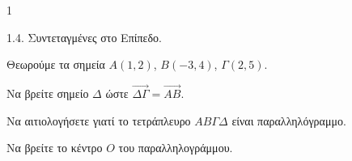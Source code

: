 \begin{ylh}{1}
    \item 1.4. Συντεταγμένες στο Επίπεδο.
\end{ylh}
Θεωρούμε τα σημεία $A(1, 2)$, $B(-3, 4)$, $\Gamma(2, 5)$.
\begin{alist}
\item Να βρείτε σημείο $\Delta$ ώστε $\vec{\Delta\Gamma} = \vec{AB}$. 
\item Να αιτιολογήσετε γιατί το τετράπλευρο $AB\Gamma\Delta$ είναι παραλληλόγραμμο. 
\item Να βρείτε το κέντρο $O$ του παραλληλογράμμου. 
\end{alist}